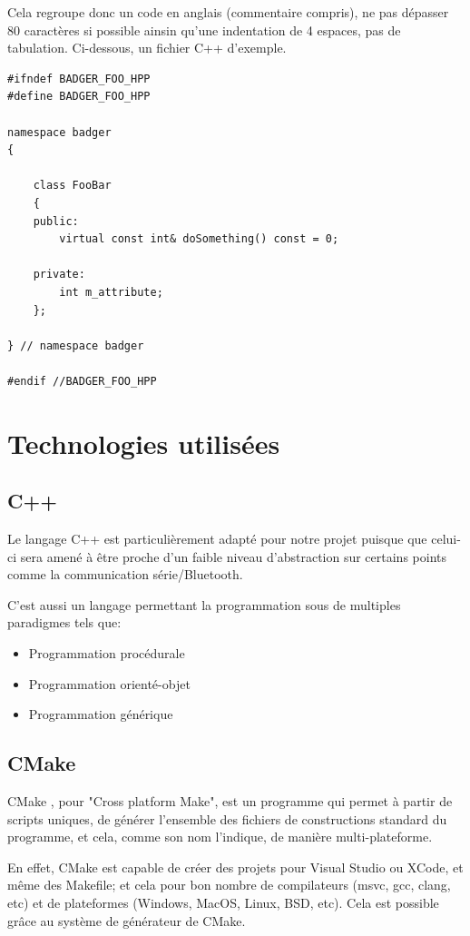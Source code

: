 Cela regroupe donc un code en anglais (commentaire compris), ne pas dépasser 80 
caractères si possible ainsin qu'une indentation de 4 espaces, pas de tabulation.
Ci-dessous, un fichier C++ d'exemple.

\begin{lstlisting}
#ifndef BADGER_FOO_HPP
#define BADGER_FOO_HPP

namespace badger
{

    class FooBar
    {
    public:
        virtual const int& doSomething() const = 0;

    private:
        int m_attribute;
    };

} // namespace badger

#endif //BADGER_FOO_HPP
\end{lstlisting}

    \section{Technologies utilisées}

        \subsection{C++}
Le langage C++ est particulièrement adapté pour notre projet puisque que celui-ci
sera amené à être proche d'un faible niveau d'abstraction sur certains points
comme la communication série/Bluetooth.

C'est aussi un langage permettant la programmation sous de multiples paradigmes
tels que:

    \begin{itemize}
    \item Programmation procédurale
    \item Programmation orienté-objet
    \item Programmation générique
    \end{itemize}

        \subsection{CMake}
CMake \cite{cmake}, pour "Cross platform Make", est un programme qui permet à partir 
de scripts uniques, de générer l'ensemble des fichiers de constructions standard 
du programme, et cela, comme son nom l'indique, de manière multi-plateforme.

En effet, CMake est capable de créer des projets pour Visual Studio ou XCode, et même 
des Makefile; et cela pour bon nombre de compilateurs (msvc, gcc, clang, etc) et 
de plateformes (Windows, MacOS, Linux, BSD, etc). Cela est possible grâce au
système de générateur de CMake.

